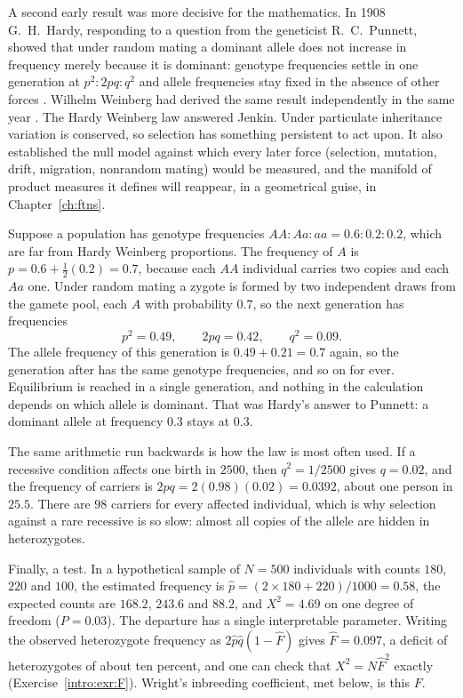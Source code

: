 A second early result was more decisive for the mathematics. In 1908 G.~H.\ Hardy, responding to a
question from the geneticist R.~C.\ Punnett, showed that under random mating a dominant allele does
not increase in frequency merely because it is dominant: genotype frequencies settle in one
generation at $p^2:2pq:q^2$ and allele frequencies stay fixed in the absence of other forces
\citep{intro:hardy1908}. Wilhelm Weinberg had derived the same result independently in the same year
\citep{intro:weinberg1908}. The Hardy Weinberg law answered Jenkin. Under particulate inheritance
variation is conserved, so selection has something persistent to act upon. It also established the
null model against which every later force (selection, mutation, drift, migration, nonrandom mating)
would be measured, and the manifold of product measures it defines will reappear, in a
geometrical guise, in Chapter~\ref{ch:ftns}.

\begin{example}\label{intro:ex:hw}
Suppose a population has genotype frequencies $AA:Aa:aa=0.6:0.2:0.2$, which are far from
Hardy Weinberg proportions. The frequency of $A$ is $p=0.6+\tfrac12(0.2)=0.7$, because each $AA$
individual carries two copies and each $Aa$ one. Under random mating a zygote is formed by two
independent draws from the gamete pool, each $A$ with probability $0.7$, so the next generation
has frequencies
\begin{equation*}
p^2=0.49,\qquad 2pq=0.42,\qquad q^2=0.09 .
\end{equation*}
The allele frequency of this generation is $0.49+0.21=0.7$ again, so the generation after has
the same genotype frequencies, and so on for ever. Equilibrium is reached in a single generation,
and nothing in the calculation depends on which allele is dominant. That was Hardy's answer to
Punnett: a dominant allele at frequency $0.3$ stays at $0.3$.

The same arithmetic run backwards is how the law is most often used. If a recessive condition
affects one birth in $2500$, then $q^2=1/2500$ gives $q=0.02$, and the frequency of carriers is
$2pq=2(0.98)(0.02)=0.0392$, about one person in $25.5$. There are $98$ carriers for every affected
individual, which is why selection against a rare recessive is so slow: almost all copies of the
allele are hidden in heterozygotes.

Finally, a test. In a hypothetical sample of $N=500$ individuals with counts $180$, $220$ and $100$,
the estimated frequency is $\hat p=(2\times180+220)/1000=0.58$, the expected counts are $168.2$,
$243.6$ and $88.2$, and $X^2=4.69$ on one degree of freedom ($P=0.03$). The departure has a single
interpretable parameter. Writing the observed heterozygote frequency as $2\hat p\hat q(1-\hat F)$
gives $\hat F=0.097$, a deficit of heterozygotes of about ten percent, and one can check that
$X^2=N\hat F^{2}$ exactly (Exercise~\ref{intro:exr:F}). Wright's inbreeding coefficient, met
below, is this $F$.
\end{example}

